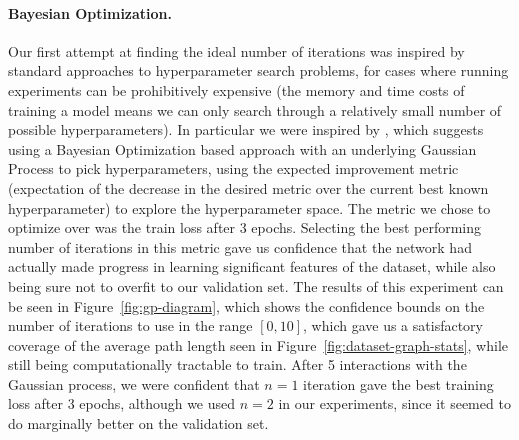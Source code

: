 \paragraph{Bayesian Optimization.}
Our first attempt at finding the ideal number of iterations was inspired by standard approaches to hyperparameter search problems, for cases where running experiments can be prohibitively expensive (the memory and time costs of training a model means we can only search through a relatively small number of possible hyperparameters).
In particular we were inspired by \cite{snoek2012practical}, which suggests using a Bayesian Optimization based approach with an underlying Gaussian Process to pick hyperparameters, using the expected improvement metric (expectation of the decrease in the desired metric over the current best known hyperparameter) to explore the hyperparameter space.
The metric we chose to optimize over was the train loss after 3 epochs.
Selecting the best performing number of iterations in this metric gave us confidence that the network had actually made progress in learning significant features of the dataset, while also being sure not to overfit to our validation set.
The results of this experiment can be seen in Figure~\ref{fig:gp-diagram}, which shows the confidence bounds on the number of iterations to use in the range $[0, 10]$, which gave us a satisfactory coverage of the average path length seen in Figure~\ref{fig:dataset-graph-stats}, while still being computationally tractable to train.
After 5 interactions with the Gaussian process, we were confident that $n=1$ iteration gave the best training loss after 3 epochs, although we used $n=2$ in our experiments, since it seemed to do marginally better on the validation set.



